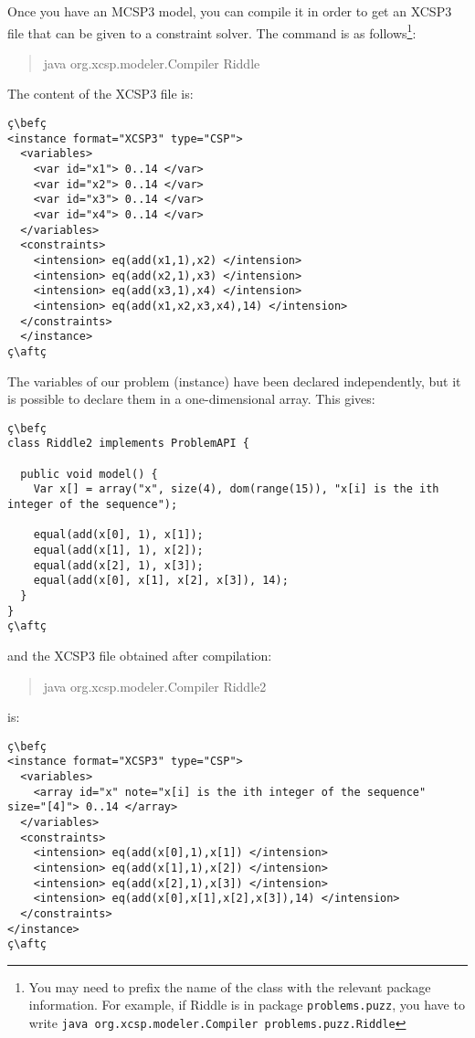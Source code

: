 \documentclass[10pt]{article}
\def\xt{{\rm XCSP3}\xspace}
\def\mt{{\rm MCSP3}\xspace}
\def\xt{{\rm XCSP3}\xspace}
\newenvironment{myvb}{\endgraf\small\verbatim}{\endverbatim}
\def\bef{\rule{10cm}{0.1mm}} %
\def\aft{\rule{10cm}{0.1mm}\medskip}
\begin{document}
Once you have an \mt model, you can compile it in order to get an \xt file that can be given to a constraint solver.
The command is as follows\footnote{You may need to prefix the name of the class with the relevant package information. For example, if Riddle is in package \texttt{problems.puzz}, you have to write \texttt{java org.xcsp.modeler.Compiler problems.puzz.Riddle}}:
\begin{quote}
\begin{myvb}
java org.xcsp.modeler.Compiler Riddle
\end{myvb}
\end{quote}
The content of the \xt file is: 
\begin{lstlisting}
ç\befç
<instance format="XCSP3" type="CSP">
  <variables>
    <var id="x1"> 0..14 </var>
    <var id="x2"> 0..14 </var>
    <var id="x3"> 0..14 </var>
    <var id="x4"> 0..14 </var>
  </variables>
  <constraints>
    <intension> eq(add(x1,1),x2) </intension>
    <intension> eq(add(x2,1),x3) </intension>
    <intension> eq(add(x3,1),x4) </intension>
    <intension> eq(add(x1,x2,x3,x4),14) </intension>
  </constraints>
  </instance>
ç\aftç
\end{lstlisting}

The variables of our problem (instance) have been declared independently, but it is possible to declare them in a one-dimensional array.
This gives:

\begin{lstlisting}
ç\befç
class Riddle2 implements ProblemAPI {

  public void model() {
    Var x[] = array("x", size(4), dom(range(15)), "x[i] is the ith integer of the sequence");
    
    equal(add(x[0], 1), x[1]);
    equal(add(x[1], 1), x[2]);
    equal(add(x[2], 1), x[3]);
    equal(add(x[0], x[1], x[2], x[3]), 14);
  }
}
ç\aftç
\end{lstlisting}
and the \xt file obtained after compilation:
\begin{quote}
\begin{myvb}
java org.xcsp.modeler.Compiler Riddle2
\end{myvb}
\end{quote}
is:
\begin{lstlisting}
ç\befç
<instance format="XCSP3" type="CSP">
  <variables>
    <array id="x" note="x[i] is the ith integer of the sequence" size="[4]"> 0..14 </array>
  </variables>
  <constraints>
    <intension> eq(add(x[0],1),x[1]) </intension>
    <intension> eq(add(x[1],1),x[2]) </intension>
    <intension> eq(add(x[2],1),x[3]) </intension>
    <intension> eq(add(x[0],x[1],x[2],x[3]),14) </intension>
  </constraints>
</instance>
ç\aftç
\end{lstlisting}
\end{document}
